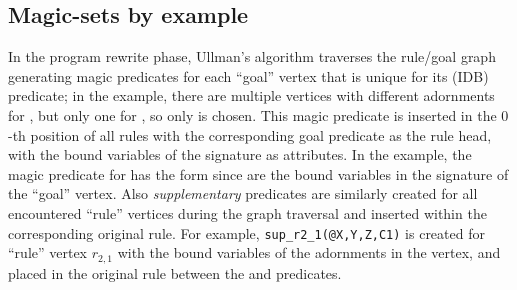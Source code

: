\subsection{Magic-sets by example}

In the program rewrite phase, Ullman's algorithm traverses the rule/goal
graph generating magic predicates for each ``goal'' vertex that is
unique for its (IDB) predicate; in the example, there are multiple vertices
with different adornments for , but only one for ,
so only  is chosen.  This magic predicate is inserted in
the $0$-th position of all rules with the corresponding goal predicate
as the rule head, with the bound variables of the signature as
attributes. In the example, the magic predicate for  has the
form  since  are the bound 
variables in the signature of the ``goal'' vertex.  Also
\emph{supplementary} predicates are similarly created for all
encountered ``rule'' vertices during the graph traversal and inserted
within the corresponding original rule.  For example, {\tt sup\_r2\_1(@X,Y,Z,C1)} 
is created for ``rule'' vertex $r_{2,1}$ with the bound variables of
the adornments in the vertex, and placed in the original rule 
between the  and  predicates.



